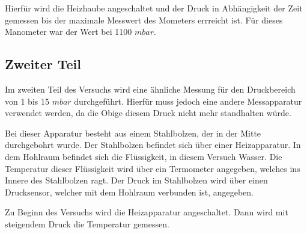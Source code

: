 Hierfür wird die Heizhaube angeschaltet und der Druck in Abhängigkeit der Zeit gemessen bis der maximale Messwert des Mometers errreicht ist.
Für dieses Manometer war der Wert bei 1100 $mbar$.

\subsection{Zweiter Teil}
Im zweiten Teil des Versuchs wird eine ähnliche Messung für den Druckbereich von 1 bis 15 $mbar$ durchgeführt.
Hierfür muss jedoch eine andere Messapparatur verwendet werden, da die Obige diesem Druck nicht mehr standhalten würde.

Bei dieser Apparatur besteht aus einem Stahlbolzen, der in der Mitte durchgebohrt wurde.
Der Stahlbolzen befindet sich über einer Heizapparatur.
In dem Hohlraum befindet sich die Flüssigkeit, in diesem Versuch Wasser.
Die Temperatur dieser Flüssigkeit wird über ein Termometer angegeben, welches ins Innere des Stahlbolzen ragt.
Der Druck im Stahlbolzen wird über einen Drucksensor, welcher mit dem Hohlraum verbunden ist, angegeben.

Zu Beginn des Versuchs wird die Heizapparatur angeschaltet.
Dann wird mit steigendem Druck die Temperatur gemessen.